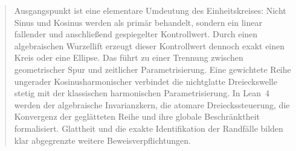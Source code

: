 \begin{abstract}
Ausgangspunkt ist eine elementare Umdeutung des Einheitskreises: Nicht Sinus
und Kosinus werden als primär behandelt, sondern ein linear fallender und
anschließend gespiegelter Kontrollwert. Durch einen algebraischen
Wurzellift erzeugt dieser Kontrollwert dennoch exakt einen Kreis oder eine
Ellipse. Das führt zu einer Trennung zwischen geometrischer Spur und zeitlicher
Parametrisierung. Eine gewichtete Reihe ungerader Kosinusharmonischer verbindet
die nichtglatte Dreieckswelle stetig mit der klassischen harmonischen
Parametrisierung. In Lean~4 werden der algebraische Invarianzkern, die atomare
Dreieckssteuerung, die Konvergenz der geglätteten Reihe und ihre globale
Beschränktheit formalisiert. Glattheit und die exakte Identifikation der
Randfälle bilden klar abgegrenzte weitere Beweisverpflichtungen.
\end{abstract}
